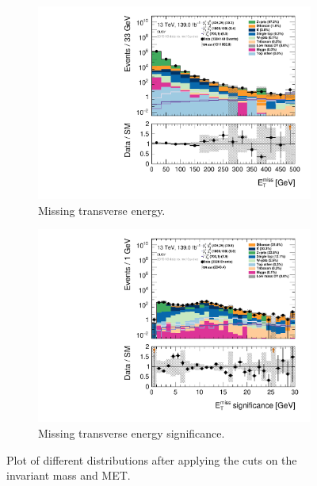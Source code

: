 \begin{figure}[H]
    \centering
    \begin{subfigure}[t!]{0.49\textwidth}
        \includegraphics[width=\textwidth]{Figures/SUSYcuts/hist1d_met_Et_SUSY.pdf}
    \caption{Missing transverse energy.}
    \label{fig:metSUSY}
    \end{subfigure}
    \begin{subfigure}[t!]{0.49\textwidth}
        \includegraphics[width=\textwidth]{Figures/SUSYcuts/hist1d_met_Sign_SUSY.pdf}
    \caption{Missing transverse energy significance.}
    \label{fig:metSignSUSY}
    \end{subfigure}
    \caption{Plot of different distributions after applying the cuts on the invariant mass and MET.}
    \label{fig:stepsSUSY2}
\end{figure}


